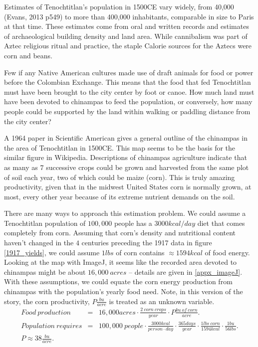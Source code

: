 \documentclass[jou]{apa7}
\newcommand{\bea}{\begin{eqnarray}}
\newcommand{\eea}{\end{eqnarray}}
\begin{document}
Estimates of Tenochtitlan's population in 1500CE vary widely, from 40,000
(Evans, 2013 p549)
to more than 400,000\cite{400k} inhabitants, comparable in size to Paris at that time. These estimates come from oral and written records and estimates of archaeological building density and land area.   While cannibalism was part of Aztec religious ritual and practice,\cite{Aztec_Cannibalism} the staple Calorie sources for the Aztecs were corn and beans.

Few if any Native American cultures made use of draft animals for food or power before the Colombian Exchange.  This means that the food that fed Tenochtitlan must have been brought to the city center by foot or canoe.  How much land must have been devoted to chinampas to feed the population, or conversely, how many people could be supported by the land within walking or paddling distance from the city center?

A 1964 paper in Scientific American\cite{Chinampas_1964} gives a general outline of the chinampas in the area of Tenochtitlan in 1500CE.  This map seems to be the basis for the similar figure in Wikipedia.\cite{chinampas_wikipedia}  
Descriptions of chinampas agriculture indicate that as many as $7$ successive crops could be grown and harvested from the same plot of soil each year, two of which could be maize (corn).  This is truly amazing productivity, given that in the midwest United States corn is normally grown, at most, every other year because of its extreme nutrient demands on the soil.

There are many ways to approach this estimation problem.  We could assume a Tenochtitlan population of $100,000$ people has a $3000kcal/day$ diet that comes completely from corn.  Assuming that corn's density and nutritional content haven't changed in the $4$ centuries preceding the 1917 data in figure \ref{1917_yields}, we could assume $1lbs$ of corn contains $\approx1594kcal$ of food energy.  
Looking at the map with ImageJ,\cite{imageJ} it seems like the recorded area devoted to chinampas might be about
$16,000~acres$ -- details are given in \ref{appx_imageJ}.
With these assumptions, we could equate the corn energy production from chinampas with the population's yearly food need. Note, in this version of the story, the corn productivity, $P\frac{bu}{acre}$ is treated as an unknown variable.  
\bea
Food~production &=& 16,000acres\cdot \frac{2~corn~crops}{year}\cdot P \frac{bu~of~corn}{acre} . \\
Population~requires &=& 100,000~people\cdot \frac{3000kcal}{person\cdot day}\cdot\frac{365days}{year}\cdot\frac{1lbs~corn}{1594kcal}\cdot\frac{1bu}{56lbs} . \\
P \approx 38\frac{bu}{acre} . && 
\eea
\end{document}

